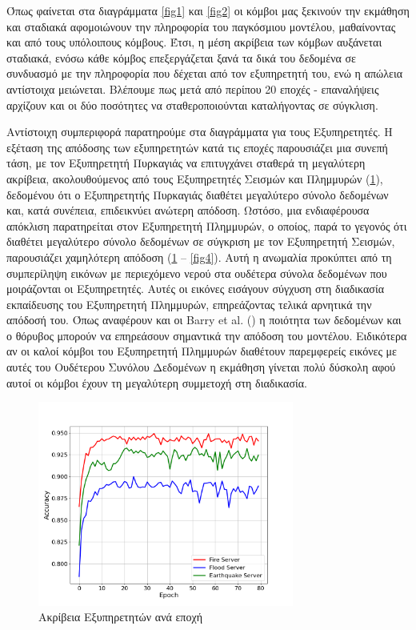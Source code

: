 Όπως φαίνεται στα διαγράμματα \ref{fig1} και \ref{fig2} οι κόμβοι μας ξεκινούν την εκμάθηση και σταδιακά αφομοιώνουν την πληροφορία του παγκόσμιου μοντέλου, μαθαίνοντας και από τους υπόλοιπους κόμβους. Έτσι, η μέση ακρίβεια των κόμβων αυξάνεται σταδιακά, ενόσω κάθε κόμβος επεξεργάζεται ξανά τα δικά του δεδομένα σε συνδυασμό με την πληροφορία που δέχεται από τον εξυπηρετητή του, ενώ η απώλεια αντίστοιχα μειώνεται. Βλέπουμε πως μετά από περίπου 20 εποχές - επαναλήψεις αρχίζουν και οι δύο ποσότητες να σταθεροποιούνται καταλήγοντας σε σύγκλιση.

Αντίστοιχη συμπεριφορά παρατηρούμε στα διαγράμματα για τους Εξυπηρετητές. Η εξέταση της απόδοσης των εξυπηρετητών κατά τις εποχές παρουσιάζει μια συνεπή τάση, με τον Εξυπηρετητή Πυρκαγιάς να επιτυγχάνει σταθερά τη μεγαλύτερη ακρίβεια, ακολουθούμενος από τους Εξυπηρετητές Σεισμών και Πλημμυρών (\ref{fig3}), δεδομένου ότι ο Εξυπηρετητής Πυρκαγιάς διαθέτει μεγαλύτερο σύνολο δεδομένων και, κατά συνέπεια, επιδεικνύει ανώτερη απόδοση. Ωστόσο, μια ενδιαφέρουσα απόκλιση παρατηρείται στον Εξυπηρετητή Πλημμυρών, ο οποίος, παρά το γεγονός ότι διαθέτει μεγαλύτερο σύνολο δεδομένων σε σύγκριση με τον Εξυπηρετητή Σεισμών, παρουσιάζει χαμηλότερη απόδοση (\ref{fig3} – \ref{fig4}). Αυτή η ανωμαλία προκύπτει από τη συμπερίληψη εικόνων με περιεχόμενο νερού στα ουδέτερα σύνολα δεδομένων που μοιράζονται οι Εξυπηρετητές. Αυτές οι εικόνες εισάγουν σύγχυση στη διαδικασία εκπαίδευσης του Εξυπηρετητή Πλημμυρών, επηρεάζοντας τελικά αρνητικά την απόδοσή του. Όπως αναφέρουν και οι Barry et al. () η ποιότητα των δεδομένων και ο θόρυβος μπορούν να επηρεάσουν σημαντικά την απόδοση του μοντέλου. Ειδικότερα αν οι καλοί κόμβοι του Εξυπηρετητή Πλημμυρών διαθέτουν παρεμφερείς εικόνες με αυτές του Ουδέτερου Συνόλου Δεδομένων η εκμάθηση γίνεται πολύ δύσκολη αφού αυτοί οι κόμβοι έχουν τη μεγαλύτερη συμμετοχή στη διαδικασία.

\begin{figure}[ht]
    \centering
    \includegraphics[width=0.75\textwidth]{figures/chapter2/Server_Accuracies.png}
    \caption{Ακρίβεια Εξυπηρετητών ανά εποχή}
    \label{fig3}
\end{figure}

